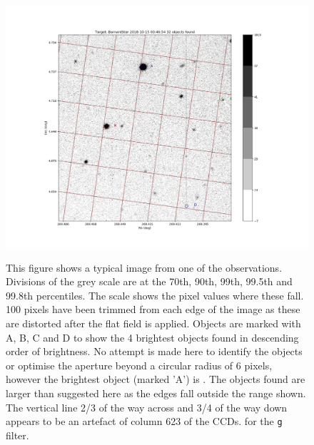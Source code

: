 \begin{figure}[!htbp]
\begin{center}
\includegraphics[scale=0.5]{images/baddisp.png} \\
\end{center}   
\caption{This figure shows a typical image from one of the {\bstar}
observations. Divisions of the grey scale are at the 70th, 90th, 99th, 99.5th
and 99.8th percentiles. The scale shows the pixel values where these fall.
100 pixels have been trimmed from each edge of the image as these are distorted
after the flat field is applied.
Objects are marked with A, B, C and D to show
the 4 brightest objects found in descending order of brightness. No attempt is made here to identify the objects or optimise the
aperture beyond a circular radius of 6 pixels, however the brightest object (marked 'A') is \bstar.
The objects found are larger than suggested here as the edges fall outside the range shown.
The vertical line 2/3 of the way across and 3/4 of the way down appears to be
an artefact of column 623 of the CCDs. for the \texttt{g} filter.}
\protect\label{fig:badimage}
\end{figure}

